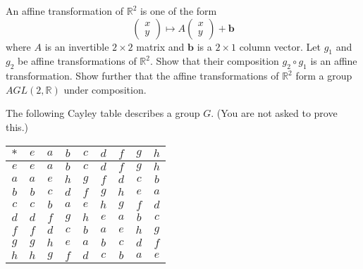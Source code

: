 \documentclass[answers]{exam}
\begin{document}
\begin{questions}
\question%
An affine transformation of $\mathbb{R}^{2}$ is one of the form \[
	\begin{pmatrix}
		x \\
		y
	\end{pmatrix} \mapsto A\begin{pmatrix}
		x \\
		y
	\end{pmatrix}+\mathbf{b}
\] where $A$ is an invertible $2 \times 2$ matrix and $\mathbf{b}$ is a $2 \times 1$ column vector. Let $g_{1}$ and $g_{2}$ be affine transformations of $\mathbb{R}^{2}$. Show that their composition $g_{2} \circ g_{1}$ is an affine transformation. Show further that the affine transformations of $\mathbb{R}^{2}$ form a group $A G L(2, \mathbb{R})$ under composition.



\question%
The following Cayley table describes a group $G$. (You are not asked to prove this.)
\begin{center}\begin{tabular}{|c||c|c|c|c|c|c|c|c|}
	\hline
	$*$ & $e$ & $a$ & $b$ & $c$ & $d$ & $f$ & $g$ & $h$ \\
	\hline\hline
	$e$ & $e$ & $a$ & $b$ & $c$ & $d$ & $f$ & $g$ & $h$ \\
	\hline
	$a$ & $a$ & $e$ & $h$ & $g$ & $f$ & $d$ & $c$ & $b$ \\
	\hline
	$b$ & $b$ & $c$ & $d$ & $f$ & $g$ & $h$ & $e$ & $a$ \\
	\hline
	$c$ & $c$ & $b$ & $a$ & $e$ & $h$ & $g$ & $f$ & $d$ \\
	\hline
	$d$ & $d$ & $f$ & $g$ & $h$ & $e$ & $a$ & $b$ & $c$ \\
	\hline
	$f$ & $f$ & $d$ & $c$ & $b$ & $a$ & $e$ & $h$ & $g$ \\
	\hline
	$g$ & $g$ & $h$ & $e$ & $a$ & $b$ & $c$ & $d$ & $f$ \\
	\hline
	$h$ & $h$ & $g$ & $f$ & $d$ & $c$ & $b$ & $a$ & $e$ \\
	\hline
\end{tabular}\end{center}
\end{questions}
\end{document}
